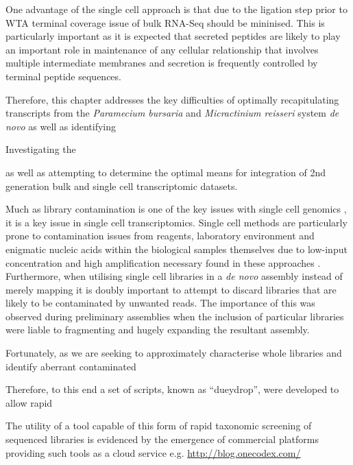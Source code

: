 One advantage of the single cell approach is that due to the ligation step prior to WTA
terminal coverage issue of bulk RNA-Seq should be mininised.  This is particularly important as it is
expected that secreted peptides are likely to play an important role in maintenance of any cellular relationship
that involves multiple intermediate membranes and secretion is frequently controlled by terminal peptide sequences.





Therefore, this chapter addresses the key difficulties of optimally recapitulating transcripts from the \textit{Paramecium bursaria}
and \textit{Micractinium reisseri} system \textit{de novo} as well as identifying 

Investigating the 



as well as attempting to determine the optimal means for integration
of 2nd generation bulk and single cell transcriptomic datasets. 






Much as library contamination is one of the key issues with single cell genomics \citep{Blainey2013,Lusk2014}, it is a key
issue in single cell transcriptomics.  Single cell methods are particularly prone to contamination issues
from reagents, laboratory environment and enigmatic nucleic acids within the biological samples themselves due to 
low-input concentration and high amplification necessary found in these approaches \citep{Blainey2013}.
Furthermore, when utilising single cell libraries in a \textit{de novo} assembly instead of merely mapping
it is doubly important to attempt to discard libraries that are likely to be contaminated by unwanted
reads.  The importance of this was observed during preliminary assemblies when the inclusion of particular
libraries were liable to fragmenting and hugely expanding the resultant assembly.  


Fortunately, as we are seeking to approximately characterise whole libraries and identify aberrant contaminated 





Therefore, to this end a set of scripts, known as ``dueydrop'', were developed to allow rapid 


The utility of a tool capable of this form of rapid taxonomic screening of sequenced libraries is evidenced
by the emergence of commercial platforms providing such tools as a cloud service e.g. \url{http://blog.onecodex.com/}







